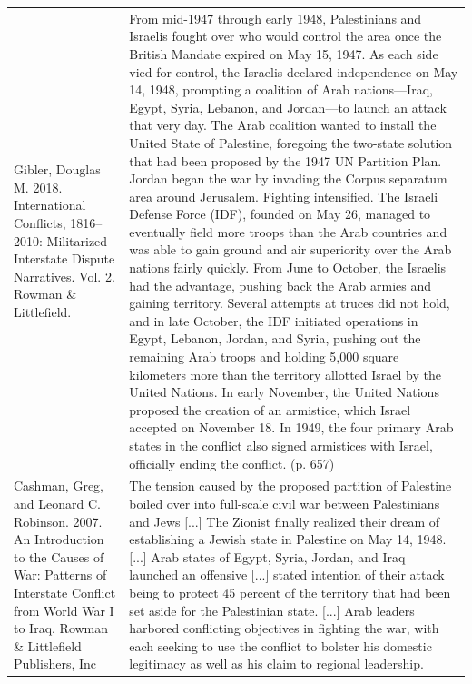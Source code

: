 {\begin{longtable}{p{}p{}}
Gibler, Douglas M. 2018. International Conflicts, 1816–2010: Militarized Interstate Dispute Narratives. Vol. 2. Rowman \& Littlefield. & From mid-1947 through early 1948, Palestinians and Israelis fought over who would control the area once the British Mandate expired on May 15, 1947. As each side vied for control, the Israelis declared independence on May 14, 1948, prompting a coalition of Arab nations—Iraq, Egypt, Syria, Lebanon, and Jordan—to launch an attack that very day. The Arab coalition wanted to install the United State of Palestine, foregoing the two-state solution that had been proposed by the 1947 UN Partition Plan. Jordan began the war by invading the Corpus separatum area around Jerusalem. Fighting intensified. The Israeli Defense Force (IDF), founded on May 26, managed to eventually field more troops than the Arab countries and was able to gain ground and air superiority over the Arab nations fairly quickly. From June to October, the Israelis had the advantage, pushing back the Arab armies and gaining territory. Several attempts at truces did not hold, and in late October, the IDF initiated operations in Egypt, Lebanon, Jordan, and Syria, pushing out the remaining Arab troops and holding 5,000 square kilometers more than the territory allotted Israel by the United Nations. In early November, the United Nations proposed the creation of an armistice, which Israel accepted on November 18. In 1949, the four primary Arab states in the conflict also signed armistices with Israel, officially ending the conflict. (p. 657)
\\
Cashman, Greg, and Leonard C. Robinson. 2007. An Introduction to the Causes of War: Patterns of Interstate Conflict from World War I to Iraq. Rowman \& Littlefield Publishers, Inc & The tension caused by the proposed partition of Palestine boiled over into full-scale civil war between Palestinians and Jews [...]
The Zionist finally realized their dream of establishing a Jewish state in Palestine on May 14, 1948. [...] Arab states of Egypt, Syria, Jordan, and Iraq launched an offensive [...] stated intention of their attack being to protect 45 percent of the territory that had been set aside for the Palestinian state. [...] Arab leaders harbored conflicting objectives in fighting the war, with each seeking to use the conflict to bolster his domestic legitimacy as well as his claim to regional leadership.
\\

\end{longtable}}

